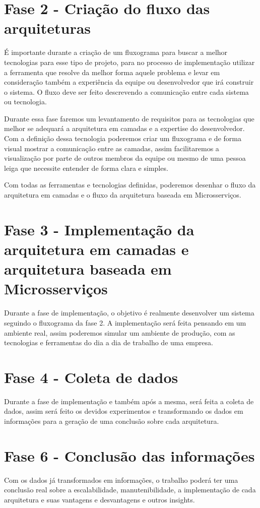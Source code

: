 \section{Fase 2 - Criação do fluxo das arquiteturas }

É importante durante a criação de um fluxograma para buscar a melhor tecnologias para esse tipo de projeto, para no processo de implementação utilizar a ferramenta que resolve da melhor forma aquele problema e levar em consideração também a experiência da equipe ou desenvolvedor que irá construir o sistema. O fluxo deve ser feito descrevendo a comunicação entre cada sistema ou tecnologia.

Durante essa fase faremos um levantamento de requisitos para as tecnologias que melhor se adequará a arquitetura em camadas e a expertise do desenvolvedor. Com a definição dessa tecnologia poderemos criar um fluxograma e de forma visual mostrar a comunicação entre as camadas, assim facilitaremos a visualização por parte de outros membros da equipe ou mesmo de uma pessoa leiga que necessite entender de forma clara e simples.

Com todas as ferramentas e tecnologias definidas, poderemos desenhar o fluxo da arquitetura em camadas e o fluxo da arquitetura baseada em Microsserviços.

\section{Fase 3 - Implementação da arquitetura em camadas e arquitetura baseada em Microsserviços}

Durante a fase de implementação, o objetivo é realmente desenvolver um sistema seguindo o fluxograma da fase 2. A implementação será feita pensando em um ambiente real, assim poderemos simular um ambiente de produção, com as tecnologias e ferramentas do dia a dia de trabalho de uma empresa.

\section{Fase 4 - Coleta de dados}

Durante a fase de implementação e também após a mesma, será feita a coleta de dados, assim será feito os devidos experimentos e transformando os dados em informações para a geração de uma conclusão sobre cada arquitetura.

\section{Fase 6 - Conclusão das informações}

Com os dados já transformados em informações, o trabalho poderá ter uma conclusão real sobre a escalabilidade, manutenibilidade, a implementação de cada arquitetura e suas vantagens e desvantagens e outros insights.